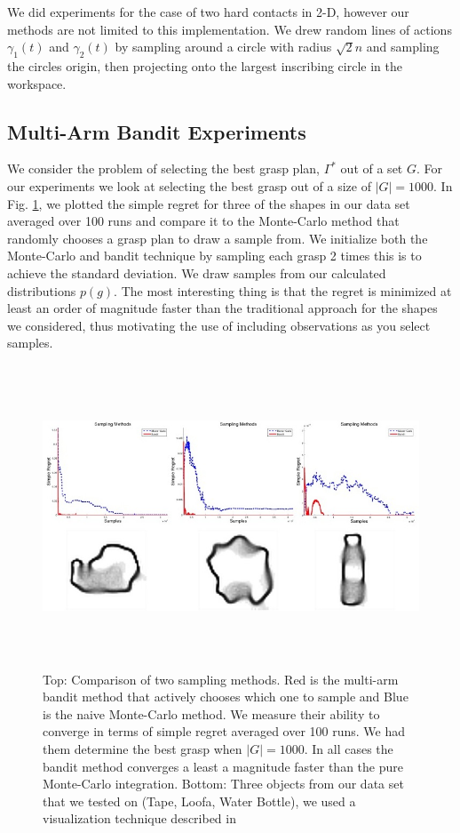 \documentclass[letterpaper, 10 pt, conference]{ieeeconf}  %
\begin{document}
We did experiments for the case of two hard contacts in 2-D, however our methods are not limited to this implementation. We drew random lines of actions $\gamma_1(t)$ and $\gamma_2(t)$ by sampling around a circle with radius $\sqrt{2}n$ and sampling the circles origin, then projecting onto the largest inscribing circle in the workspace. 





\subsection{Multi-Arm Bandit Experiments}

We consider the problem of selecting the best grasp plan, $\Gamma^*$ out of a set $G$. For our experiments we look at selecting the best grasp out of a size of $|G| = 1000$. In Fig. \ref{fig:simple_regret}, we plotted the simple regret for three of the shapes in our data set averaged over 100 runs and compare it to the Monte-Carlo method that randomly chooses a grasp plan to draw a sample from. We initialize both the Monte-Carlo and bandit technique by sampling each grasp 2 times this is to achieve the standard deviation. We draw samples from our calculated distributions $p(g)$.  The most interesting thing is that the regret is minimized at least an order of magnitude faster than the traditional approach for the shapes we considered, thus motivating the use of including observations as you select samples. 

\begin{figure}[ht!]
\centering
\includegraphics[width = 16.5cm, height = 9cm]{figures/Slide09.jpg}
\caption{ \footnotesize Top: Comparison of two sampling methods. Red is the multi-arm bandit method that actively chooses which one to sample and Blue is the naive Monte-Carlo method. We measure their ability to converge in terms of simple regret averaged over 100 runs. We had them determine the best grasp when $|G|=1000$. In all cases the bandit method converges a least a magnitude faster than the pure Monte-Carlo integration. Bottom: Three objects from our data set that we tested on (Tape, Loofa, Water Bottle), we used a visualization technique described in \cite{mahler2015opt}}
\vspace*{-10pt}
\label{fig:simple_regret}
\end{figure}
\end{document}
